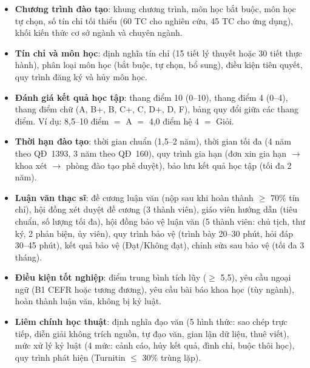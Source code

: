\begin{itemize}
    \item \textbf{Chương trình đào tạo}: khung chương trình, môn học bắt buộc, môn
          học tự chọn, số tín chỉ tối thiểu (60 TC cho nghiên cứu, 45 TC cho ứng
          dụng), khối kiến thức cơ sở ngành và chuyên ngành.

    \item \textbf{Tín chỉ và môn học}: định nghĩa tín chỉ (15 tiết lý thuyết hoặc
          30 tiết thực hành), phân loại môn học (bắt buộc, tự chọn, bổ sung), điều
          kiện tiên quyết, quy trình đăng ký và hủy môn học.

    \item \textbf{Đánh giá kết quả học tập}: thang điểm 10 (0--10), thang điểm 4
          (0--4), thang điểm chữ (A, B+, B, C+, C, D+, D, F), bảng quy đổi giữa
          các thang điểm. Ví dụ: 8,5--10 điểm $=$ A $=$ 4,0 điểm hệ 4 $=$ Giỏi.

    \item \textbf{Thời hạn đào tạo}: thời gian chuẩn (1,5--2 năm), thời gian tối
          đa (4 năm theo QĐ~1393, 3 năm theo QĐ~160), quy trình gia hạn (đơn xin
          gia hạn $\to$ khoa xét $\to$ phòng đào tạo phê duyệt), bảo lưu kết quả
          học tập (tối đa 2 năm).

    \item \textbf{Luận văn thạc sĩ}: đề cương luận văn (nộp sau khi hoàn thành
          $\geq$ 70\% tín chỉ), hội đồng xét duyệt đề cương (3 thành viên), giáo
          viên hướng dẫn (tiêu chuẩn, số lượng tối đa), hội đồng bảo vệ luận văn
          (5 thành viên: chủ tịch, thư ký, 2 phản biện, ủy viên), quy trình bảo vệ
          (trình bày 20--30 phút, hỏi đáp 30--45 phút), kết quả bảo vệ (Đạt/Không
          đạt), chỉnh sửa sau bảo vệ (tối đa 3 tháng).

    \item \textbf{Điều kiện tốt nghiệp}: điểm trung bình tích lũy ($\geq$ 5,5),
          yêu cầu ngoại ngữ (B1 CEFR hoặc tương đương), yêu cầu bài báo khoa học
          (tùy ngành), hoàn thành luận văn, không bị kỷ luật.

    \item \textbf{Liêm chính học thuật}: định nghĩa đạo văn (5 hình thức: sao chép
          trực tiếp, diễn giải không trích nguồn, tự đạo văn, gian lận dữ liệu,
          thuê viết), mức xử lý kỷ luật (4 mức: cảnh cáo, hủy kết quả, đình chỉ,
          buộc thôi học), quy trình phát hiện (Turnitin $\leq$ 30\% trùng lặp).
\end{itemize}


